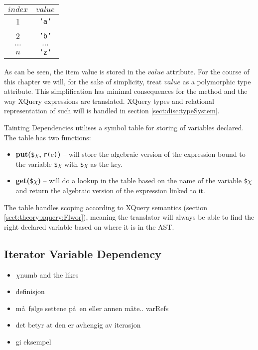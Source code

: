 \begin{center}
\begin{tabular}{|c|c|} \hline
$index$ & $value$ \\\hline
1		& \texttt{'a'} \\\hline
2		& \texttt{'b'} \\\hline
$\ldots$& $\ldots$ \\\hline
$n$		& \texttt{'z'} \\\hline
\end{tabular}
\end{center}


As can be seen, the item value is stored in the $value$ attribute. For the course of this chapter we will, for the
sake of simplicity, treat $value$ as a polymorphic type attribute. This simplification has minimal consequences
for the method and the way XQuery expressions are translated. XQuery types and relational representation of such
will is handled in section \ref{sect:disc:typeSystem}. 

Tainting Dependencies utilises a symbol table for storing of variables declared. The table has two functions:
\begin{itemize}
  \item \textbf{put(}\texttt{\$}$\chi$\textbf{, }\texttt{r(}$e$\texttt{)}\textbf{)} -- will store the
  algebraic version of the expression bound to the variable \texttt{\$}$\chi$ with \texttt{\$}$\chi$ as the key.  
  \item \textbf{get(}\texttt{\$}$\chi$\textbf{)} -- will do a lookup in the table based on the name of the variable
  \texttt{\$}$\chi$ and return the algebraic version of the expression linked to it.
\end{itemize}
The table handles scoping according to XQuery semantics (section \ref{sect:theory:xquery:Flwor}), meaning the
translator will always be able to find the right declared variable based on where it is in the AST.

\subsection{Iterator Variable Dependency}
\label{sect:trans:TD:dependency}
\begin{itemize}
  \item $\chi$numb and the likes
  \item definisjon
  \item m\aa~f\o lge settene p\aa~en eller annen m\aa te.. varRefs
  \item det betyr at den er avhengig av iterasjon
  \item gi eksempel
\end{itemize}

